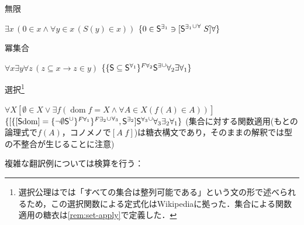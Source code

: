 \documentclass[../../main-detail.tex]{subfiles}
\begin{document}
\begin{exe}
\begin{xlist}
    \end{xlist}
    \ex 無限
    \begin{xlist}
        \ex $\exists x\,
        \left(
            0 \in x
            \land
            \forall y \in x\,(S(y) \in x)
        \right)$
        \ex $\{0 \in \mathsf S^{\exists_1} \ni [\clsop{\mathsf S^{\exists_1}}^{\forall}\; S] \forall\}$
    \end{xlist}
    \ex 冪集合
    \begin{xlist}
        \ex $\forall x \exists y \forall z\,
        (z \subseteq x \to z \in y)$
        \ex $\{\{\mathsf S \subseteq \mathsf S^{\forall_1}\}^{F\forall_2} \clsop{\mathsf S^{\exists}} \forall_2\exists\forall_1\}$
    \end{xlist}
    \ex 選択\footnote{選択公理は\cite{kunen}では「すべての集合は整列可能である」という文の形で述べられるため，この選択関数による定式化はWikipediaに拠った．集合による関数適用の糖衣は\ref{rem:set-apply}で定義した．}
    \begin{xlist}
        \ex $\forall X[\emptyset \in X \lor \exists f (\mathop{\mathrm{dom}}f = X \land \forall A\in X (f(A) \in A))]$
        \ex $\{[\clsop{\{[\mathsf S \mathrm{dom}] = \{\lnot \emptyset \clsop{\mathsf S}\}^{F\forall_1}\}^{F\exists_2}}^{\forall_3},\mathsf S^{\exists_2}]\clsop{\mathsf S^{\forall_3}}\forall_3\exists_2\forall_1\}$
        \glt (集合に対する関数適用(もとの論理式で$f(A)$，コノメノで$[A\;f]$)は糖衣構文であり，そのままの解釈では型の不整合が生じることに注意)
    \end{xlist}
\end{exe}

複雑な翻訳例については検算を行う：
\end{document}
